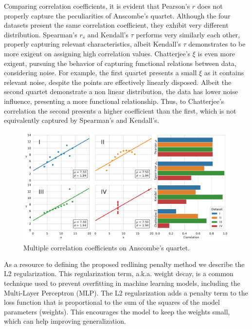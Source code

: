 Comparing correlation coefficients, it is evident that Pearson's $r$ does not properly capture the peculiarities of Anscombe's quartet. Although the four datasets present the same correlation coefficient, they exhibit very different distribution. Spearman's $r_s$ and Kendall's $\tau$ performs very similarly each other, properly capturing relevant characteristics, albeit Kendall's $\tau$ demonstrates to be more exigent on assigning high correlation values. Chatterjee's $\xi$ is even more exigent, pursuing the behavior of capturing functional relations between data, considering noise. For example, the first quartet presents a small $\xi$ as it contains relevant noise, despite the points are effectively linearly disposed. Albeit the second quartet demonstrate a non linear distribution, the data has lower noise influence, presenting a more functional relationship. Thus, to Chatterjee's correlation the second presents a higher coefficient than the first, which is not equivalently captured by Spearman's and Kendall's. 
\begin{figure}[!ht]
\centering
\caption{Multiple correlation coefficients on Anscombe's quartet.}\label{fig:anscombe}
    \includegraphics[width=1\linewidth]{images/anscombe_quartet.pdf}
\end{figure}



As a resource to defining the proposed redlining penalty method we describe the L2 regularization. This regularization term, a.k.a. weight decay, is a common technique used to prevent overfitting in machine learning models, including the Multi-Layer Perceptron (MLP). The L2 regularization adds a penalty term to the loss function that is proportional to the sum of the squares of the model parameters (weights). This encourages the model to keep the weights small, which can help improving generalization.

